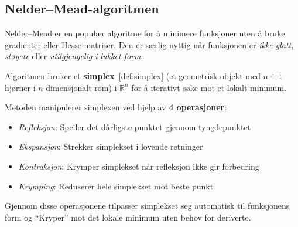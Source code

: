 \subsection{Nelder--Mead-algoritmen}
\label{sec:nelder_mead}

Nelder--Mead er en populær algoritme  for å minimere funksjoner uten å bruke gradienter eller Hesse-matriser.
Den er særlig nyttig når funksjonen er \emph{ikke-glatt}, \emph{støyete} eller \emph{utilgjengelig i lukket form}.

Algoritmen bruker et \textbf{simplex}~\ref{def:simplex} (et geometrisk objekt med \( n+1 \) hjørner i \( n \)-dimensjonalt rom) i \( \mathbb{R}^n \) for å iterativt søke mot et lokalt minimum.

\begin{minipage}[t]{0.56\textwidth}
	Metoden manipulerer simplexen ved hjelp av \textbf{4 operasjoner}:
	\noindent
	\begin{itemize}
		\item \emph{Refleksjon}: Speiler det dårligste punktet gjennom tyngdepunktet
		\item \emph{Ekspansjon}: Strekker simplekset i lovende retninger
		\item \emph{Kontraksjon}: Krymper simplekset når refleksjon ikke gir forbedring
		\item \emph{Krymping}: Reduserer hele simplekset mot beste punkt
	\end{itemize}
	Gjennom disse operasjonene tilpasser simplekset seg automatisk til funksjonens form og \enquote{Kryper} mot det lokale minimum uten behov for deriverte.
\end{minipage}
\hfill
